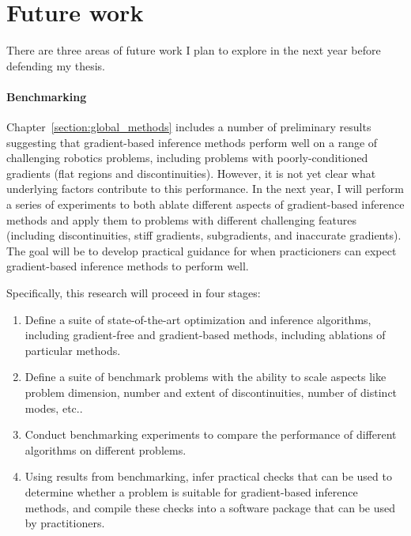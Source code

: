 
\section{Future work}\label{section:future_work}

There are three areas of future work I plan to explore in the next year before defending my thesis.

\paragraph{Benchmarking} Chapter~\ref{section:global_methods} includes a number of preliminary results suggesting that gradient-based inference methods perform well on a range of challenging robotics problems, including problems with poorly-conditioned gradients (flat regions and discontinuities). However, it is not yet clear what underlying factors contribute to this performance. In the next year, I will perform a series of experiments to both ablate different aspects of gradient-based inference methods and apply them to problems with different challenging features (including discontinuities, stiff gradients, subgradients, and inaccurate gradients). The goal will be to develop practical guidance for when practicioners can expect gradient-based inference methods to perform well.

Specifically, this research will proceed in four stages:
\begin{enumerate}
    \item Define a suite of state-of-the-art optimization and inference algorithms, including gradient-free and gradient-based methods, including ablations of particular methods.
    \item Define a suite of benchmark problems with the ability to scale aspects like problem dimension, number and extent of discontinuities, number of distinct modes, etc..
    \item Conduct benchmarking experiments to compare the performance of different algorithms on different problems.
    \item Using results from benchmarking, infer practical checks that can be used to determine whether a problem is suitable for gradient-based inference methods, and compile these checks into a software package that can be used by practitioners.
\end{enumerate}

